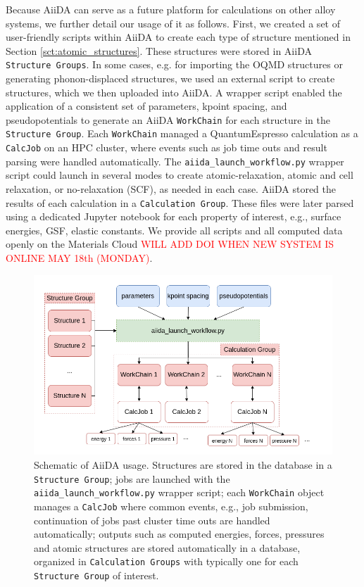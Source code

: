 \documentclass{article}
\begin{document}
Because AiiDA can serve as a future platform for calculations on other alloy systems, we further detail our usage of it as follows.
First, we created a set of user-friendly scripts within AiiDA to create each type of structure mentioned in Section \ref{sct:atomic_structures}.
These structures were stored in AiiDA \texttt{Structure Groups}.
In some cases, e.g. for importing the OQMD structures or generating phonon-displaced structures, we used an external script to create structures, which we then uploaded into AiiDA.
A wrapper script enabled the application of a consistent set of parameters, kpoint spacing, and pseudopotentials to generate an AiiDA \texttt{WorkChain} for each structure in the \texttt{Structure Group}.
Each \texttt{WorkChain} managed a QuantumEspresso calculation as a \texttt{CalcJob} on an HPC cluster, 
where events such as job time outs and result parsing were handled automatically.
The \texttt{aiida_launch_workflow.py} wrapper script could launch in several modes to create atomic-relaxation, atomic and cell relaxation, or no-relaxation (SCF), as needed in each case.
AiiDA stored the results of each calculation in a \texttt{Calculation Group}.  These files were later parsed using a dedicated Jupyter\cite{Kluyver2016} notebook for each property of interest, e.g., surface energies, GSF, elastic constants. 
We provide all scripts and all computed data openly on the Materials Cloud\cite{Talirz2020MaterialsScience} \textcolor{red}{WILL ADD DOI WHEN NEW SYSTEM IS ONLINE MAY 18th (MONDAY)}.


\begin{figure}[H]%
\centering%
\includegraphics[width=1.0\textwidth,center]{figures/recalculateDBschematic.png}%
\caption{Schematic of AiiDA usage.  Structures are stored in the database in a \lstinline{Structure Group}; jobs are launched with the \lstinline{aiida_launch_workflow.py} wrapper script; each \lstinline{WorkChain} object manages a \lstinline{CalcJob} where common events, e.g., job submission, continuation of jobs past cluster time outs are handled automatically; outputs such as computed energies, forces, pressures and atomic structures are stored automatically in a database, organized in \lstinline{Calculation Groups} with typically one
for each \lstinline{Structure Group} of interest.
}
\label{fig:aiida_methods}
\end{figure}
\end{document}
